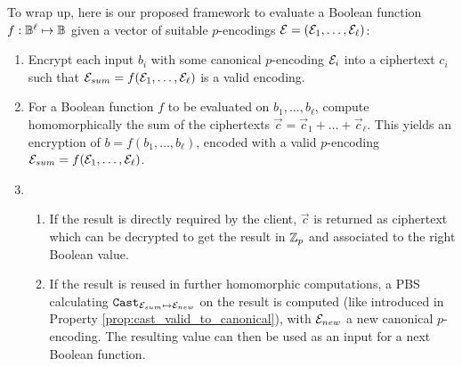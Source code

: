 To wrap up, here is our proposed framework to evaluate a Boolean function $f: \mathbb{B}^\ell \mapsto \mathbb{B}$ given a vector of suitable $p$-encodings $\mathcal{E} = (\mathcal{E}_1, \dots, \mathcal{E}_\ell)$:

\begin{enumerate}
\item Encrypt each input $b_i$ with some canonical $p$-encoding $\mathcal{E}_i$ into a ciphertext $c_i$ such that $\mathcal{E}_{sum} = f(\mathcal{E}_1, \dots, \mathcal{E}_\ell)$ is a valid encoding.
\item For a Boolean function $f$ to be evaluated on $b_1, \dots, b_\ell$, compute homomorphically the sum of the ciphertexts $\vec c = \vec{c}_1 + \dots + \vec{c}_\ell$. This yields an encryption of $b = f(b_1, \dots, b_\ell)$, encoded with a valid $p$-encoding $\mathcal{E}_{sum} = f(\mathcal{E}_1, \dots, \mathcal{E}_\ell)$.
\item \begin{enumerate}
    \item If the result is directly required by the client, $\vec c$ is returned as ciphertext which can be decrypted to get the result in $\mathbb{Z}_p$ and associated to the right Boolean value.
    \item If the result is reused in further homomorphic computations, a \gls{PBS} calculating $\texttt{Cast}_{\mathcal{E}_{sum} \mapsto \mathcal{E}_{new}}$ on the result is computed (like introduced in Property \ref{prop:cast_valid_to_canonical}), with $\mathcal{E}_{new}$ a new canonical $p$-encoding. The resulting value can then be used as an input for a next Boolean function.
    \end{enumerate}
\end{enumerate}


